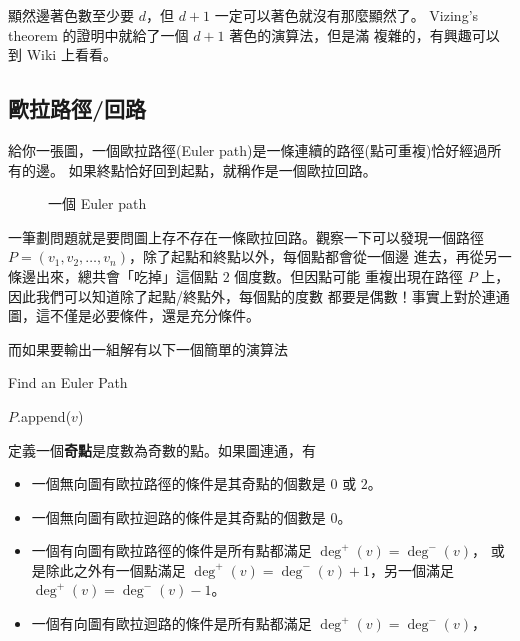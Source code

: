\documentclass[a4paper,12pt]{book}
\begin{document}
顯然邊著色數至少要 $d$，但 $d+1$ 一定可以著色就沒有那麼顯然了。
Vizing's theorem 的證明中就給了一個 $d+1$ 著色的演算法，但是滿
複雜的，有興趣可以到 Wiki 上看看。

\subsection{歐拉路徑/回路}
給你一張圖，一個歐拉路徑(Euler path)是一條連續的路徑(點可重複)恰好經過所有的邊。
如果終點恰好回到起點，就稱作是一個歐拉回路。

\begin{figure}[H]
  \centering
  
  \caption{一個 Euler path}
\end{figure}

一筆劃問題就是要問圖上存不存在一條歐拉回路。觀察一下可以發現一個路徑
$P = (v_1, v_2, \dots, v_n)$，除了起點和終點以外，每個點都會從一個邊
進去，再從另一條邊出來，總共會「吃掉」這個點 $2$ 個度數。但因點可能
重複出現在路徑 $P$ 上，因此我們可以知道除了起點/終點外，每個點的度數
都要是偶數！事實上對於連通圖，這不僅是必要條件，還是充分條件。

而如果要輸出一組解有以下一個簡單的演算法

\begin{algorithm}[H]
  \DontPrintSemicolon
  \caption{Find an Euler Path}\label{euclid}
   {
  $P$.append($v$) \;
}
\end{algorithm}

\begin{theorem}
  定義一個{\bf 奇點}是度數為奇數的點。如果圖連通，有
  \begin{itemize}
    \item 一個無向圖有歐拉路徑的條件是其奇點的個數是 $0$ 或 $2$。
    \item 一個無向圖有歐拉迴路的條件是其奇點的個數是 $0$。
    \item 一個有向圖有歐拉路徑的條件是所有點都滿足 $\deg^+(v) = \deg^-(v)$，
      或是除此之外有一個點滿足 $\deg^+(v) = \deg^-(v) + 1$，另一個滿足
      $\deg^+(v) = \deg^-(v) - 1$。
    \item 一個有向圖有歐拉迴路的條件是所有點都滿足 $\deg^+(v) = \deg^-(v)$，
  \end{itemize}
\end{theorem}


\end{document}
